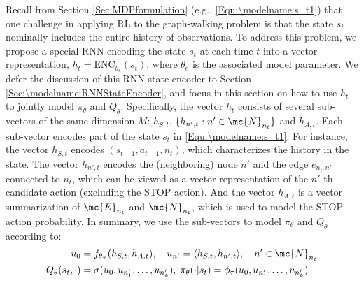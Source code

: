 \documentclass{article}
\begin{document}
	Recall from Section \ref{Sec:MDPformulation} (e.g., \eqref{Equ:\modelname:s_t1}) that one challenge in applying RL to the graph-walking problem is that the state $s_t$ nominally includes the entire history of observations. To address this problem, we propose a special RNN encoding the state $s_t$ at each time $t$ into a vector representation, $h_t = \mathrm{ENC}_{\theta_e}(s_t)$, where $\theta_e$ is the associated model parameter. We defer the discussion of this RNN state encoder to Section \ref{Sec:\modelname:RNNStateEncoder}, and focus in this section on how to use $h_t$ to jointly model $\pi_{\theta}$ and $Q_{\theta}$. Specifically, the vector  $h_t$ consists of several sub-vectors of the same dimension $M$: $h_{S,t}$,  $\{h_{n',t}: n' \in \mc{N}_{n_t}\}$ and $h_{A,t}$. Each sub-vector encodes part of the state $s_t$ in \eqref{Equ:\modelname:s_t1}. For instance, the vector $h_{S,t}$ encodes $(s_{t-1}, a_{t-1}, n_t)$, which characterizes the history in the state. The vector $h_{n',t}$ encodes the (neighboring) node $n'$ and the edge $e_{n_t,n'}$ connected to $n_t$, which can be viewed as a vector representation of the $n'$-th candidate action (excluding the STOP action). And the vector $h_{A,t}$ is a vector summarization of $\mc{E}_{n_t}$ and $\mc{N}_{n_t}$, which is used to model the STOP action probability. In summary, we use the sub-vectors to model $\pi_{\theta}$ and $Q_{\theta}$ according to:
    	\begin{align}
        	u_0		&=
        	f_{\theta_{\pi}}(h_{S,t}, h_{A,t}), \quad
        	u_{n'}	=
        	\langle h_{S,t}, h_{n',t} \rangle, \quad n' \in \mc{N}_{n_t}
        	\label{Equ:\modelname:u}
        	\\
        	Q_{\theta}(s_t, \cdot)
        	&=
        	\sigma(u_0, u_{n_1'},\ldots,u_{n_k'}),
        	\;
        	\pi_{\theta}(\cdot | s_t)
        	=
        	\phi_{\tau}(u_0, u_{n_1'},\ldots,u_{n_k'})
        	\label{Equ:\modelname:PolicyNet}
    	\end{align}
\end{document}

